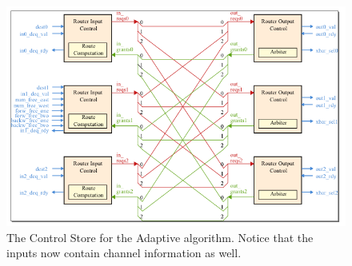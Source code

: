 \documentclass[10pt]{article}
\begin{document}
\begin{figure}[h]
	\centering
	\includegraphics[scale=0.7]{altctrl}
	\caption{The Control Store for the Adaptive algorithm. 
			 Notice that the inputs now contain channel information as well.}
	\label{fig:altctrl}
\end{figure}
\end{document}

